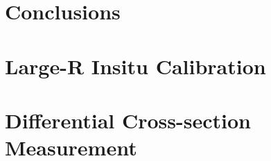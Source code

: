 \newpage
\chapter{Conclusions}
\label{sec:conclusion}

\FloatBarrier


%
%
\printbibliography[title={References},heading=bibintoc] %

\begin{uomappendix} 
\chapter{Large-R \zjets Insitu Calibration}

\chapter{Differential Cross-section Measurement}

\end{uomappendix}



